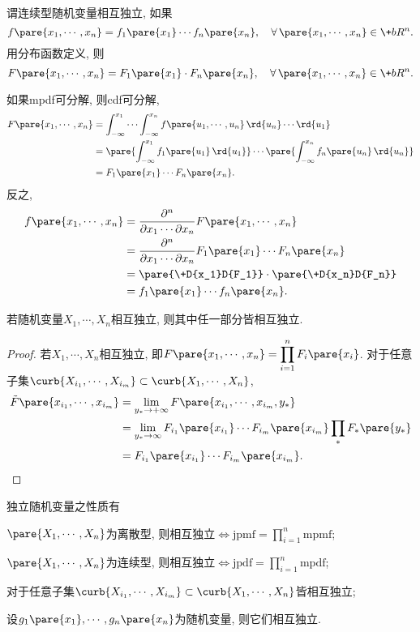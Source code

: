 \documentclass{ctexart}
\begin{document}
\begin{definition}
    谓连续型随机变量相互独立, 如果
    \[ f\pare{x_1,\cdots, x_n} = f_1\pare{x_1}\cdots f_n\pare{x_n},\quad \forall\,\pare{x_1,\cdots,x_n}\in\+bR^n. \]
    用分布函数定义, 则
    \[ F\pare{x_1,\cdots, x_n} = F_1\pare{x_1}\cdot F_n\pare{x_n},\quad \forall\,\pare{x_1,\cdots,x_n}\in\+bR^n. \]
\end{definition}
如果mpdf可分解, 则cdf可分解,
\begin{align}
    F\pare{x_1,\cdots,x_n} &= \int_{-\infty}^{x_1}\cdots \int_{-\infty}^{x_n} f\pare{u_1,\cdots,u_n}\, \rd{u_n}\cdots \rd{u_1} \\
    &= \pare{\int_{-\infty}^{x_1}f_1\pare{u_1}\,\rd{u_1}} \cdots \pare{\int_{-\infty}^{x_n}f_n\pare{u_n}\,\rd{u_n}} \\
    &= F_1\pare{x_1}\cdots F_n\pare{x_n}.
\end{align}
反之,
\begin{align*}
    f\pare{x_1,\cdots, x_n} &= \frac{\partial^n}{\partial x_1 \cdots \partial x_n} F\pare{x_1,\cdots, x_n} \\
    &= \frac{\partial^n}{\partial x_1 \cdots \partial x_n} F_1\pare{x_1}\cdots F_n\pare{x_n}\\
    &= \pare{\+D{x_1}D{F_1}} \cdot \pare{\+D{x_n}D{F_n}} \\
    &= f_1\pare{x_1}\cdots f_n\pare{x_n}.
\end{align*}
\begin{sample}
    \begin{ex}
        若随机变量$X_1,\cdots, X_n$相互独立, 则其中任一部分皆相互独立.
    \end{ex}
    \begin{proof}
        若$X_1,\cdots,X_n$相互独立, 即$F\pare{x_1,\cdots, x_n} = \displaystyle \prod_{i=1}^n F_i\pare{x_i}$. 对于任意子集$\curb{X_{i_1},\cdots, X_{i_m}}\subset \curb{X_1,\cdots,X_n}$,
        \begin{align*}
            \tilde{F}\pare{x_{i_1},\cdots,x_{i_m}} &= \lim_{y_*\rightarrow +\infty} F\pare{x_{i_1},\cdots, x_{i_m},y_*} \\
            &= \lim_{y_*\rightarrow \infty} F_{i_1}\pare{x_{i_1}}\cdots F_{i_m}\pare{x_{i_m}} \prod_* F_*\pare{y_*} \\
            &= F_{i_1}\pare{x_{i_1}}\cdots F_{i_m}\pare{x_{i_m}}. \qedhere
        \end{align*}
    \end{proof}
\end{sample}
独立随机变量之性质有
\begin{cenum}
    \item $\pare{X_1,\cdots,X_n}$为离散型, 则相互独立$\Leftrightarrow \mathrm{jpmf} = \displaystyle \prod_{i=1}^n \mathrm{mpmf}$;
    \item $\pare{X_1,\cdots,X_n}$为连续型, 则相互独立$\Leftrightarrow \mathrm{jpdf} = \displaystyle \prod_{i=1}^n \mathrm{mpdf}$;
    \item 对于任意子集$\curb{X_{i_1},\cdots, X_{i_m}}\subset \curb{X_1,\cdots,X_n}$皆相互独立;
    \item 设$g_1\pare{x_1},\cdots,g_n\pare{x_n}$为随机变量, 则它们相互独立.
\end{cenum}
\end{document}
